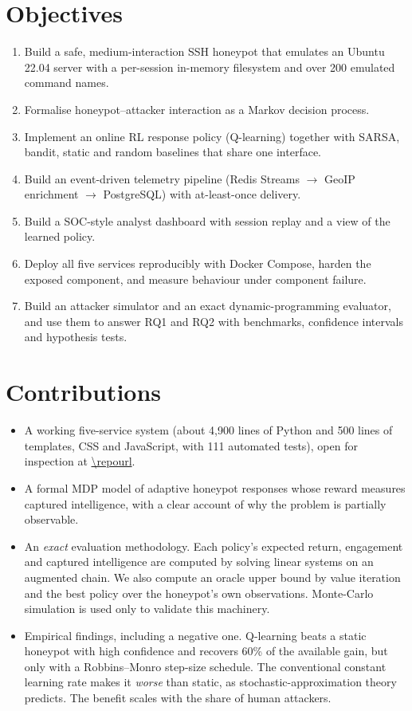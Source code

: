 \section{Objectives}

\begin{enumerate}[label=\textbf{O\arabic*.}]
  \item Build a safe, medium-interaction SSH honeypot that emulates an Ubuntu 22.04 server with
    a per-session in-memory filesystem and over 200 emulated command names.
  \item Formalise honeypot--attacker interaction as a Markov decision process.
  \item Implement an online RL response policy (Q-learning) together with SARSA, bandit,
    static and random baselines that share one interface.
  \item Build an event-driven telemetry pipeline (Redis Streams $\rightarrow$ GeoIP enrichment
    $\rightarrow$ PostgreSQL) with at-least-once delivery.
  \item Build a SOC-style analyst dashboard with session replay and a view of the learned policy.
  \item Deploy all five services reproducibly with Docker Compose, harden the exposed
    component, and measure behaviour under component failure.
  \item Build an attacker simulator and an exact dynamic-programming evaluator, and use them to
    answer RQ1 and RQ2 with benchmarks, confidence intervals and hypothesis tests.
\end{enumerate}

\section{Contributions}

\begin{itemize}
  \item A working five-service system (about 4{,}900 lines of Python and 500 lines of templates, CSS and JavaScript, with 111 automated tests), open
    for inspection at \url{\repourl}.
  \item A formal MDP model of adaptive honeypot responses whose reward measures captured
    intelligence, with a clear account of why the problem is partially observable.
  \item An \emph{exact} evaluation methodology. Each policy's expected return, engagement and
    captured intelligence are computed by solving linear systems on an augmented chain. We also
    compute an oracle upper bound by value iteration and the best policy over the honeypot's own
    observations. Monte-Carlo simulation is used only to validate this machinery.
  \item Empirical findings, including a negative one. Q-learning beats a static honeypot with
    high confidence and recovers 60\% of the available gain, but only with a Robbins--Monro
    step-size schedule. The conventional constant learning rate makes it \emph{worse} than
    static, as stochastic-approximation theory predicts. The benefit scales with the share of
    human attackers.
\end{itemize}


